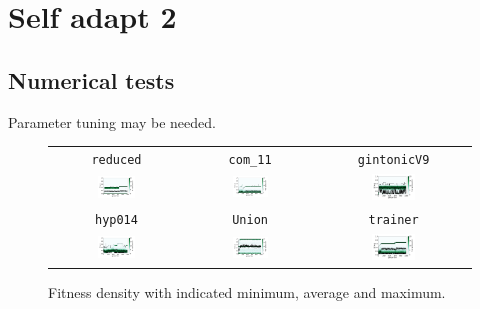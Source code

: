 \documentclass[11pt,a4paper]{scrartcl}
\begin{document}
\section{Self adapt 2}


\subsection{Numerical tests}

Parameter tuning may be needed.

\begin{figure}[H]
\center
\begin{tabular}{ccc}
\texttt{reduced} & \texttt{com\_11} & \texttt{gintonicV9} \\
\includegraphics[width=0.3\textwidth]{img/self_adapt_2_reduced.png} &
\includegraphics[width=0.3\textwidth]{img/self_adapt_2_com_11.png} &
\includegraphics[width=0.3\textwidth]{img/self_adapt_2_gintonicV9.png} \\
\texttt{hyp014} & \texttt{Union} & \texttt{trainer} \\
\includegraphics[width=0.3\textwidth]{img/self_adapt_2_hyp014.png} &
\includegraphics[width=0.3\textwidth]{img/self_adapt_2_Union.png} &
\includegraphics[width=0.3\textwidth]{img/self_adapt_2_trainer.png}
\end{tabular}
\caption{Fitness density with indicated minimum, average and maximum.}
\label{fig:self_adapt_2}
\end{figure}
\end{document}
